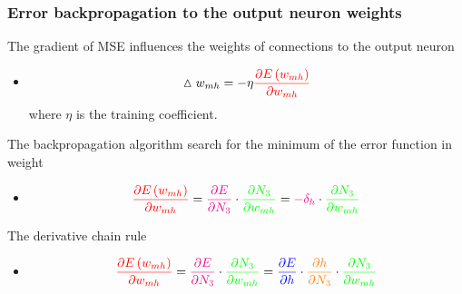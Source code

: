 \documentclass[proffesionalfonts]{beamer}
\begin{document}
\begin{frame}
\frametitle{Error backpropagation to the output neuron weights}
\begin{block}{The gradient of MSE influences the weights of connections to the output neuron}
\begin{itemize}
\item[\ ]
\[ \vartriangle w_{mh} = - \eta \textcolor{red}{\frac{\partial E \left( w_{mh} \right) }{ \partial w_{mh}} } \]  where $\eta$ is the training coefficient.
\end{itemize}
\end{block}
\begin{block}{The backpropagation algorithm search for the minimum of the error function in weight}
\begin{itemize}
\item[\ ]
\[ \textcolor{red}{\frac{\partial E \left( w_{mh} \right) }{ \partial w_{mh} }} = \textcolor{magenta}{\frac{\partial E }{ \partial N_3 }} \cdot \textcolor{green}{\frac{ \partial N_3 }{ \partial w_{mh} }} = \textcolor{magenta}{- \delta_h} \cdot \textcolor{green}{\frac{ \partial N_3 }{ \partial w_{mh} }} \]
\end{itemize}
\end{block}
\begin{block}{The derivative chain rule}
\begin{itemize}
\item[\ ]
\[ \textcolor{red}{\frac{\partial E \left( w_{mh} \right) }{ \partial w_{mh} }} = \textcolor{magenta}{\frac{\partial E }{ \partial N_3 }} \cdot \textcolor{green}{\frac{ \partial N_3 }{ \partial w_{mh} }} = \textcolor{blue}{\frac{ \partial E }{ \partial h }} \cdot \textcolor{orange}{\frac{ \partial h }{ \partial N_3 }} \cdot \textcolor{green}{\frac{ \partial N_3 }{ \partial w_{mh} }} \]
\end{itemize}
\end{block}
\end{frame}
\end{document}

